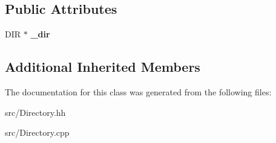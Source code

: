 \subsection*{Public Attributes}
\begin{DoxyCompactItemize}
\item 
\hypertarget{classstb_1_1Directory_ac58fdfb158775e3054546de9f1b003e4}{D\+I\+R $\ast$ {\bfseries \+\_\+dir}}\label{classstb_1_1Directory_ac58fdfb158775e3054546de9f1b003e4}

\end{DoxyCompactItemize}
\subsection*{Additional Inherited Members}


The documentation for this class was generated from the following files\+:\begin{DoxyCompactItemize}
\item 
src/Directory.\+hh\item 
src/Directory.\+cpp\end{DoxyCompactItemize}
